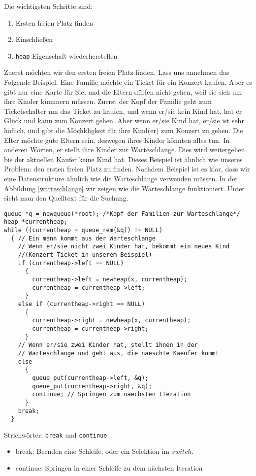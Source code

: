 Die wichtigsten Schritte sind:
\begin{enumerate}
\item Ersten freien Platz finden
\item Einschließen
\item \texttt{heap} Eigenschaft wiederherstellen
\end{enumerate}
Zuerst möchten wir den ersten freien Platz finden. Lass uns annehmen
das Folgende Beispiel. Eine Familie möchte ein Ticket für ein Konzert kaufen.
Aber es gibt nur eine Karte für Sie, und die Eltern dürfen nicht gehen, weil sie sich 
um ihre Kinder kümmern müssen. Zuerst der Kopf der Familie geht zum Ticketschalter
um das Ticket zu kaufen, und wenn er/sie  kein Kind hat, hat er Glück und
kann zum Konzert gehen. Aber wenn er/sie Kind hat, er/sie ist sehr höflich, und 
gibt die Möchkligkeit für ihre Kind(er) zum Konzert zu gehen. Die Elter möchte 
gute Eltern sein, deswegen ihres Kinder könnten alles tun. In anderen Wörten, er
stellt ihre Kinder zur Warteschlange. Dies wird weitergehen bis der aktuellen Käufer 
keine Kind hat. Dieses Beispiel ist ähnlich wie unseres Problem: den ersten freien 
Platz zu finden. Nachdem Beispiel ist es klar, dass wir eine Datenstrukture ähnlich wie 
die Warteschlange verwenden müssen. In der Abbildung \ref{warteschlange} wir zeigen wie 
die Warteschlange funktioniert. Unter sieht man den Quelltext für die Suchung.


\begin{lstlisting}
queue *q = newqueue(*root); /*Kopf der Familien zur Warteschlange*/
heap *currentheap;
while ((currentheap = queue_rem(&q)) != NULL)
  { // Ein mann kommt aus der Warteschlange
    // Wenn er/sie nicht zwei Kinder hat, bekommt ein neues Kind
    //(Konzert Ticket in unserem Beispiel)
    if (currentheap->left == NULL)
      {
        currentheap->left = newheap(x, currentheap);
        currentheap = currentheap->left;
      }
    else if (currentheap->right == NULL)
      {
        currentheap->right = newheap(x, currentheap);
        currentheap = currentheap->right;
      }
    // Wenn er/sie zwei Kinder hat, stellt ihnen in der
    // Warteschlange und geht aus, die naeschte Kaeufer kommt
    else
      {
        queue_put(currentheap->left, &q);
        queue_put(currentheap->right, &q);
        continue; // Springen zum naechsten Iteration
      }
    break;
  }
\end{lstlisting}
\begin{myexampleblock}{Strichwörter: \texttt{break} und \texttt{continue}}
\begin{itemize}
\item break: Beenden eine Schleife, oder ein Selektion im $switch$.
\item continue: Springen in einer Schleife zu dem nächsten Iteration
\end{itemize}
\end{myexampleblock}


